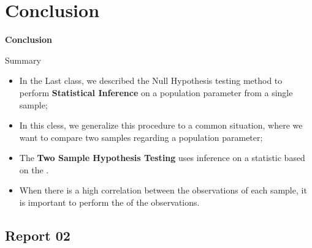 \section{Conclusion}
\begin{frame}
  \begin{center}
    {\bf Conclusion}
  \end{center}
\end{frame}

\begin{frame}{Summary}
  \begin{itemize}
    \item In the Last class, we described the Null Hypothesis testing method to perform {\bf Statistical Inference} on a population parameter from a single sample;
    \bigskip

    \item In this cless, we generalize this procedure to a common situation, where we want to compare two samples regarding a population parameter;
    \bigskip

    \item The {\bf Two Sample Hypothesis Testing} uses inference on a statistic based on the .\bigskip

    \item When there is a high correlation between the observations of each sample, it is important to perform the  of the observations.
  \end{itemize}
\end{frame}

\subsection{Report 02}

